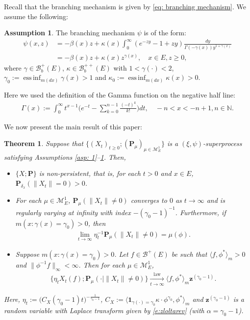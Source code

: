 \documentclass[12pt,a4paper]{amsart}
\newtheorem{thm}{Theorem}[section]
\theoremstyle{definition}
\newtheorem{asp}{Assumption}
\numberwithin{equation}{section}
\begin{document}
Recall that the branching mechanism is given by \eqref{eq: branching mechanism}. 
We assume the following:
\begin{asp} \label{asp: 4}
	The branching mechanism $\psi$ is of the form:
  \begin{align}
    \psi(x,z)
    &= - \beta(x) z + \kappa(x) \int_0^\infty (e^{-z y} - 1+ z y) \frac{dy}{\Gamma(- \gamma(x)) y^{1+ \gamma(x)}}
    \\&= -\beta (x) z + \kappa(x) z^{\gamma(x)},
    \quad x\in E, z \geq 0,
\end{align}
where $\gamma \in \mathscr B^+_b(E)$, $\kappa \in \mathscr B^{++}_b(E)$ with $1< \gamma(\cdot )<2$, $\gamma_0 := \operatorname{ess\,inf}_{m(dx)} \gamma(x)> 1$ and $\kappa_0:=\operatorname{ess\,inf}_{m(dx)}\kappa(x) > 0$.
\end{asp}
Here we used the definition of the Gamma function on the negative half line:
\begin{align}\label{eq: definition of Gamma function}
  \Gamma(x)
  := \int_0^\infty t^{x-1} \Big(e^{-t} - \sum_{k=0}^{n-1} \frac{(-t)^k}{k!}\Big) dt,
  \quad -n< x< -n+1, n\in \mathbb N.
\end{align}
	
We now present the main result of this paper:
\begin{thm}
\label{thm: main theorem}
  Suppose that $\{(X_t)_{t\geq 0}; (\mathbf P_\mu)_{\mu \in \mathcal M_E^1}\}$ is a $(\xi, \psi)$-superprocess satisfying Assumptions \ref{asp: 1}--\ref{asp: 4}.
  Then,
  \begin{itemize}
  \item[(1)]
    $\{X; \mathbf P\}$ is non-persistent, that is, for each $t > 0$ and $x\in E$,
    $\mathbf P_{\delta_x}( \| X_t\| = 0) > 0$.
  \item[(2)]
    For each $\mu \in \mathcal M^1_E$, $\mathbf P_{\mu}(\|X_t\| \neq 0)$ converges to $0$ as $t \to \infty$ and is regularly varying at infinity with index $-(\gamma_0-1)^{-1}$.
    Furthermore, if $m(x: \gamma (x)= \gamma_0)>0$, then
    \begin{align}
      \lim_{t\to\infty} \eta_t^{-1}\mathbf P_{\mu}(\|X_t\| \neq 0)
      =\mu(\phi).
    \end{align}
  \item[(3)]
    Suppose $m( x:\gamma(x)=\gamma_0 )>0$.
    Let $f \in \mathscr B^+(E)$ be such that $\langle f, \phi^* \rangle_m > 0$ and $\| \phi^{-1}f \|_\infty < \infty$. Then for each $\mu \in \mathcal M_E^1$,
    \begin{align}
      \{\eta_t X_t(f) ; \mathbf P_{\mu}(\cdot |\|X_t\| \neq 0) \}
      \xrightarrow[t\to \infty]{\operatorname{law}} \langle f, \phi^*\rangle_m \mathbf z^{(\gamma_0 - 1)}.
    \end{align}
  \end{itemize}
  Here, $\eta_t := \big( C_X(\gamma_0 - 1) t \big)^{- \frac {1} {\gamma_0 - 1} }$, $C_X := \langle \mathbf 1_{\gamma(\cdot) = \gamma_0} \kappa\cdot \phi^{\gamma_0}, \phi^* \rangle_m$ and $\mathbf z^{(\gamma_0 - 1)}$ is a random variable with Laplace transform given by \eqref{e:zloltarev}
  (with $\alpha=\gamma_0 -1$).
\end{thm}
\end{document}
